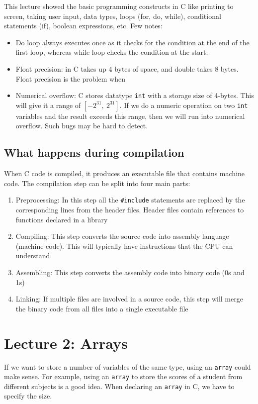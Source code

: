 \documentclass[11pt]{article}
\begin{document}
This lecture showed the basic programming constructs in C like printing to screen, taking user input, data types, loops (for, do, while), conditional statements (if), boolean expressions, etc. Few notes: 
\begin{itemize}
	\item Do loop always executes once as it checks for the condition at the end of the first loop, whereas while loop checks the condition at the start. 
	\item Float precision\cite{floatingpoint}: in C takes up 4 bytes of space, and double takes 8 bytes. Float precision is the problem when 
	\item Numerical overflow: C stores datatype \texttt{int} with a storage size of 4-bytes. This will give it a range of $[-2^{31},\ 2^{31}]$. If we do a numeric operation on two \texttt{int} variables and the result exceeds this range, then we will run into numerical overflow. Such bugs may be hard to detect.
\end{itemize}

\subsection*{What happens during compilation}
When C code is compiled, it produces an executable file that contains machine code. The compilation step can be split into four main parts: 
\begin{enumerate}
	\item Preprocessing: In this step all the \texttt{\#include} statements are replaced by the corresponding lines from the header files. Header files contain references to functions declared in a library 
	\item Compiling: This step converts the source code into assembly language (machine code). This will typically have instructions that the CPU can understand. 
	\item Assembling: This step converts the assembly code into binary code (0s and 1s)
	\item Linking: If multiple files are involved in a source code, this step will merge the binary code from all files into a single executable file 
\end{enumerate}

\section*{Lecture 2: Arrays}
If we want to store a number of variables of the same type, using an \texttt{array} could make sense. For example, using an \texttt{array} to store the scores of a student from different subjects is a good idea. When declaring an \texttt{array} in C, we have to specify the size. 
\end{document}
